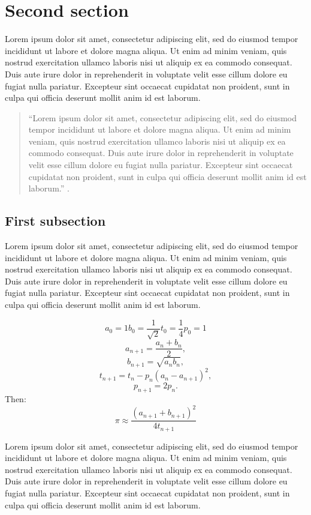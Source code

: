 \documentclass[11pt]{article}
\begin{document}
\section{Second section}
Lorem ipsum dolor sit amet, consectetur adipiscing elit, sed do eiusmod tempor incididunt ut labore et dolore magna aliqua. Ut enim ad minim veniam, quis nostrud exercitation ullamco laboris nisi ut aliquip ex ea commodo consequat. Duis aute irure dolor in reprehenderit in voluptate velit esse cillum dolore eu fugiat nulla pariatur. Excepteur sint occaecat cupidatat non proident, sunt in culpa qui officia deserunt mollit anim id est laborum.

\begin{quote}
   “Lorem ipsum dolor sit amet, consectetur adipiscing elit, sed do eiusmod tempor incididunt ut labore et dolore magna aliqua. Ut enim ad minim veniam, quis nostrud exercitation ullamco laboris nisi ut aliquip ex ea commodo consequat. Duis aute irure dolor in reprehenderit in voluptate velit esse cillum dolore eu fugiat nulla pariatur. Excepteur sint occaecat cupidatat non proident, sunt in culpa qui officia deserunt mollit anim id est laborum.” \cite{c4}.
\end{quote}

\subsection{First subsection}
Lorem ipsum dolor sit amet, consectetur adipiscing elit, sed do eiusmod tempor incididunt ut labore et dolore magna aliqua. Ut enim ad minim veniam, quis nostrud exercitation ullamco laboris nisi ut aliquip ex ea commodo consequat. Duis aute irure dolor in reprehenderit in voluptate velit esse cillum dolore eu fugiat nulla pariatur. Excepteur sint occaecat cupidatat non proident, sunt in culpa qui officia deserunt mollit anim id est laborum.

$$ a_0 = 1 b_0 = \frac{1}{\sqrt{2}} t_0 = \frac{1}{4} p_0 = 1$$
$$a_{n+1} = \frac{a_n + b_n}{2}, $$
$$b_{n+1} = \sqrt{a_nb_n}, $$
$$t_{n+1} = t_n - p_n(a_n - a_{n+1})^2, $$
$$p_{n+1} = 2p_n. $$
Then:
$$\pi \approx \frac{(a_{n+1} + b_{n+1})^2}{4t_{n+1}}$$

Lorem ipsum dolor sit amet, consectetur adipiscing elit, sed do eiusmod tempor incididunt ut labore et dolore magna aliqua. Ut enim ad minim veniam, quis nostrud exercitation ullamco laboris nisi ut aliquip ex ea commodo consequat. Duis aute irure dolor in reprehenderit in voluptate velit esse cillum dolore eu fugiat nulla pariatur. Excepteur sint occaecat cupidatat non proident, sunt in culpa qui officia deserunt mollit anim id est laborum.
\end{document}
